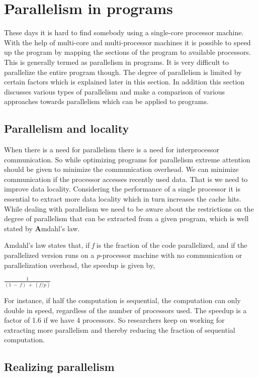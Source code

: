 \label{chap:background}

\section{Parallelism in programs}
These days it is hard to find somebody using a single-core processor machine.
With the help of multi-core and multi-processor machines it is possible to speed up 
the program by mapping the sections of the program to available processors. This 
is generally termed as parallelism in programs. It is very difficult to parallelize
the entire program though. The degree of parallelism is limited by certain factors which is
explained later in this section. In addition this section discusses various types of parallelism and
make a comparison of various approaches towards parallelism which can be applied to programs.

\subsection{Parallelism and locality}
When there is a need for parallelism there is a need for interprocessor communication.
So while optimizing programs for parallelism extreme attention should be given to
minimize the communication overhead. We can minimize communication if the
processor accesses recently used data. That is we need to improve data
locality. Considering the performance of a single processor it is
essential to extract more data locality which in turn increases
the cache hits. While dealing with parallelism we need to be aware
about the restrictions on the degree of parallelism that can
be extracted from a given program, which is well stated by {\textbf Amdahl}'s law.

Amdahl's law  states that, if \emph{f} is the fraction of the code parallelized, and if
the parallelized version runs on a \emph{p}-processor machine with no communication
or parallelization overhead, the speedup is given by,
\begin{center}
$\frac{1}{(1\ -\ f)\ +\ (f/p)}$
\end{center}

For instance, if half the computation is sequential, the computation can only
double in speed, regardless of the number of processors used. The speedup
is a factor of 1.6 if we have 4 processors. So researchers keep on working
for extracting more parallelism and thereby reducing the fraction of sequential
computation.

\subsection{Realizing parallelism}

